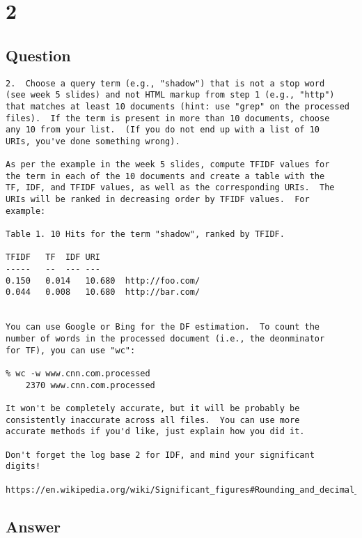 \documentclass[letterpaper,11pt]{article}
\begin{document}
\clearpage


\section*{2}

\subsection*{Question}

\begin{verbatim}
2.  Choose a query term (e.g., "shadow") that is not a stop word
(see week 5 slides) and not HTML markup from step 1 (e.g., "http")
that matches at least 10 documents (hint: use "grep" on the processed
files).  If the term is present in more than 10 documents, choose
any 10 from your list.  (If you do not end up with a list of 10
URIs, you've done something wrong).

As per the example in the week 5 slides, compute TFIDF values for
the term in each of the 10 documents and create a table with the
TF, IDF, and TFIDF values, as well as the corresponding URIs.  The
URIs will be ranked in decreasing order by TFIDF values.  For
example:

Table 1. 10 Hits for the term "shadow", ranked by TFIDF.

TFIDF	TF	IDF	URI
-----	--	---	---
0.150	0.014	10.680	http://foo.com/
0.044	0.008	10.680	http://bar.com/


You can use Google or Bing for the DF estimation.  To count the
number of words in the processed document (i.e., the deonminator
for TF), you can use "wc":

% wc -w www.cnn.com.processed
    2370 www.cnn.com.processed

It won't be completely accurate, but it will be probably be
consistently inaccurate across all files.  You can use more 
accurate methods if you'd like, just explain how you did it.  

Don't forget the log base 2 for IDF, and mind your significant
digits!

https://en.wikipedia.org/wiki/Significant_figures#Rounding_and_decimal_places
\end{verbatim}

\subsection*{Answer}		
\end{document}
